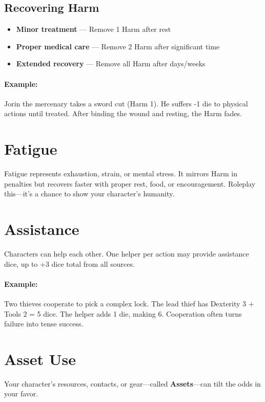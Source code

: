 \begin{multicols}{2}
\subsection*{Recovering Harm}
\begin{itemize}
  \item \textbf{Minor treatment} — Remove 1 Harm after rest
  \item \textbf{Proper medical care} — Remove 2 Harm after significant time
  \item \textbf{Extended recovery} — Remove all Harm after days/weeks
\end{itemize}

\paragraph{Example:}  
Jorin the mercenary takes a sword cut (Harm 1). He suffers -1 die to physical actions until treated. After binding the wound and resting, the Harm fades.

\section{Fatigue} 

Fatigue represents exhaustion, strain, or mental stress. It mirrors Harm in penalties but recovers faster with proper rest, food, or encouragement. Roleplay this—it’s a chance to show your character’s humanity.

\section{Assistance} 

Characters can help each other. One helper per action may provide assistance dice, up to +3 dice total from all sources.

\paragraph{Example:}  
Two thieves cooperate to pick a complex lock. The lead thief has Dexterity 3 + Tools 2 = 5 dice. The helper adds 1 die, making 6. Cooperation often turns failure into tense success.

\section{Asset Use} 

Your character’s resources, contacts, or gear—called \textbf{Assets}—can tilt the odds in your favor.


\end{multicols}
